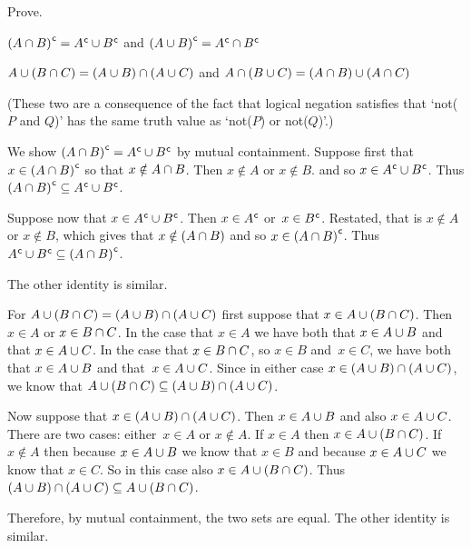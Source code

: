 \documentclass{ibl}  %
\begin{document}
\begin{ex}  Prove.
\begin{exes}
\item 
  ${(A\cap B)}^{\mspace{1mu}\mathsf{c}}={A}^{\mspace{1mu}\mathsf{c}}\cup{B}^{\mspace{1mu}\mathsf{c}}$
  and
  ${(A\cup B)}^{\mspace{1mu}\mathsf{c}}={A}^{\mspace{1mu}\mathsf{c}}\cap{B}^{\mspace{1mu}\mathsf{c}}$ 
\item {} 
$A\cup (B\cap C)=(A\cup B)\cap (A\cup C)$
 and $A\cap (B\cup C)=(A\cap B)\cup (A\cap C)$
\end{exes}
\begin{ans}
\begin{exes}
\item (These two are a consequence of the fact that logical negation
  satisfies that `not($P$ and $Q$)' has the same truth value as
  `not($P$) or not($Q$)'.)

  We show  ${(A\cap B)}^{\mspace{1mu}\mathsf{c}}={A}^{\mspace{1mu}\mathsf{c}}\cup{B}^{\mspace{1mu}\mathsf{c}}$
  by mutual containment.
  Suppose first that $x\in {(A\cap B)}^{\mspace{1mu}\mathsf{c}}$ so that
  $x\notin A\cap B$.
  Then $x\notin A$ or $x\notin B$.
  and so $x\in {A}^{\mspace{1mu}\mathsf{c}}\cup{B}^{\mspace{1mu}\mathsf{c}}$.
  Thus ${(A\cap B)}^{\mspace{1mu}\mathsf{c}}\subseteq{A}^{\mspace{1mu}\mathsf{c}}\cup{B}^{\mspace{1mu}\mathsf{c}}$.

  Suppose now that $x\in {A}^{\mspace{1mu}\mathsf{c}}\cup{B}^{\mspace{1mu}\mathsf{c}}$.
  Then $x\in{A}^{\mspace{1mu}\mathsf{c}}$ or~$x\in{B}^{\mspace{1mu}\mathsf{c}}$.
  Restated, that is $x\notin A$ or $x\notin B$,
  which gives that $x\notin (A\cap B)$ and
  so $x\in{(A\cap B)}^{\mspace{1mu}\mathsf{c}}$.
  Thus ${A}^{\mspace{1mu}\mathsf{c}}\cup{B}^{\mspace{1mu}\mathsf{c}}\subseteq{(A\cap B)}^{\mspace{1mu}\mathsf{c}}$.
  
  The other identity is similar.
\item For $A\cup (B\cap C)=(A\cup B)\cap (A\cup C)$
  first suppose that $x\in A\cup (B\cap C)$.
  Then $x\in A$ or $x\in B\cap C$.
  In the case that $x\in A$ we have both that $x\in A\cup B$ and that
  $x\in A\cup C$.
  In the case that $x\in B\cap C$, so $x\in B$ and~$x\in C$, 
  we have both that $x\in A\cup B$ and that~$x\in A\cup C$.
  Since in either case $x\in (A\cup B)\cap (A\cup C)$,
  we know that 
  $A\cup (B\cap C)\subseteq (A\cup B)\cap (A\cup C)$.

  Now suppose that $x\in (A\cup B)\cap (A\cup C)$.
  Then $x\in A\cup B$ and also $x\in A\cup C$.
  There are two cases: either~$x\in A$ or $x\notin A$.
  If $x\in A$ then $x\in A\cup (B\cap C)$.
  If $x\notin A$ then because $x\in A\cup B$ we know that $x\in B$
  and because $x\in A\cup C$ we know that $x\in C$.
  So in this case also $x\in A\cup (B\cap C)$.
  Thus 
  $(A\cup B)\cap (A\cup C)\subseteq A\cup (B\cap C)$.

  Therefore, by mutual containment, the two sets are equal.
  The other identity is similar.
\end{exes}
\end{ans}
\end{ex}
\end{document}
